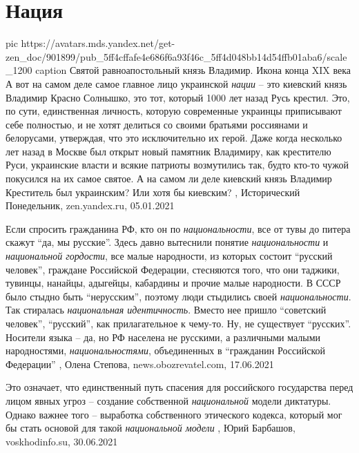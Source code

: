  
 
 
 
 
\chapter{Нация}
\label{sec:slova.nacia}

\ifcmt
  pic https://avatars.mds.yandex.net/get-zen_doc/901899/pub_5ff4cffafe4e686f6a93f46c_5ff4d048bb14d54ffb01aba6/scale_1200
	caption Святой равноапостольный князь Владимир. Икона конца XIX века
\fi
А вот на самом деле самое главное лицо украинской \emph{нации} – это киевский
князь Владимир Красно Солнышко, это тот, который 1000 лет назад Русь крестил.
Это, по сути, единственная личность, которую современные украинцы приписывают
себе полностью, и не хотят делиться со своими братьями россиянами и белорусами,
утверждая, что это исключительно их герой.  Даже когда несколько лет назад в
Москве был открыт новый памятник Владимиру, как крестителю Руси, украинские
власти и всякие патриоты возмутились так, будто кто-то чужой покусился на их
самое святое. А на самом ли деле киевский князь Владимир Креститель был
украинским? Или хотя бы киевским?
,
Исторический Понедельник, zen.yandex.ru, 05.01.2021 

Если спросить гражданина РФ, кто он по \emph{национальности}, все от тувы до питера
скажут \enquote{да, мы русские}. Здесь давно вытеснили понятие \emph{национальности} и
\emph{национальной гордости}, все малые народности, из которых состоит \enquote{русский
человек}, граждане Российской Федерации, стесняются того, что они таджики,
тувинцы, нанайцы, адыгейцы, кабардины и прочие малые народности. В СССР было
стыдно быть \enquote{нерусским}, поэтому люди стыдились своей \emph{национальности}. Так
стиралась \emph{национальная идентичность}. Вместо нее пришло \enquote{советский человек},
\enquote{русский}, как прилагательное к чему-то.  Ну, не существует \enquote{русских}. Носители
языка – да, но РФ населена не русскими, а различными малыми народностями,
\emph{национальностями}, объединенных в \enquote{гражданин Российской Федерации}
, 
Олена Степова, news.obozrevatel.com, 17.06.2021

Это означает, что единственный путь спасения для российского государства перед
лицом явных угроз – создание собственной \emph{национальной} модели диктатуры. Однако
важнее того – выработка собственного этического кодекса, который мог бы стать
основой для такой \emph{национальной модели}
, 
Юрий Барбашов, voskhodinfo.su, 30.06.2021

